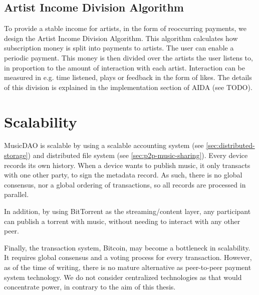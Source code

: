 \subsection{Artist Income Division Algorithm}
\label{sec:aida-design}
To provide a stable income for artists, in the form of reoccurring payments, we design the Artist Income Division Algorithm. This algorithm calculates how subscription money is split into payments to artists. The user can enable a periodic payment. This money is then divided over the artists the user listens to, in proportion to the amount of interaction with each artist. Interaction can be measured in e.g. time listened, plays or feedback in the form of likes. The details of this division is explained in the implementation section of AIDA (see TODO).

\section{Scalability}
MusicDAO is scalable by using a scalable accounting system (see \ref{sec:distributed-storage}) and distributed file system (see \ref{sec:p2p-music-sharing}). Every device records its own history. When a device wants to publish music, it only transacts with one other party, to sign the metadata record. As such, there is no global consensus, nor a global ordering of transactions, so all records are processed in parallel.

In addition, by using BitTorrent as the streaming/content layer, any participant can publish a torrent with music, without needing to interact with any other peer. 

Finally, the transaction system, Bitcoin, may become a bottleneck in scalability. It requires global consensus and a voting process for every transaction. However, as of the time of writing, there is no mature alternative as peer-to-peer payment system technology. We do not consider centralized technologies as that would concentrate power, in contrary to the aim of this thesis.